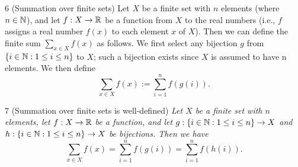 \begin{definition}{6}
    \label{finite-set-sum}
    (Summation over finite sets) Let $X$ be a finite set with $n$ elements (where
    $n \in \mathbb{N}$), and let $f: X \rightarrow \mathbb{R}$ be a function from $X$
    to the real numbers (i.e., $f$ assigns a real number $f(x)$ to each element
    $x$ of $X$). Then we can define the finite sum $\sum_{x \in X} f(x)$ as follows.
    We first select any bijection $g$ from $\{i \in \mathbb{N} : 1 \leq i \leq n\}$
    to $X$; such a bijection exists since $X$ is assumed to have n elements. We
    then define
    \begin{equation*}
        \sum_{x \in X} f(x) := \sum_{i=1}^{n} f(g(i)).
    \end{equation*}
\end{definition}

\begin{proposition}{7}
    \label{finite-set-sum-well-defined}
    (Summation over finite sets is well-defined) \emph{Let $X$ be a finite set
    with $n$ elements, let $f: X \rightarrow \mathbb{R}$ be a function, and let $g: \{i \in \mathbb{N} : 1 \leq i \leq n\} \rightarrow X$
    and $h: \{i \in \mathbb{N} : 1 \leq i \leq n\} \rightarrow X$ be bijections.
    Then we have
    \begin{equation*}
        \sum_{x \in X} f(x) = \sum_{i=1}^{n} f(g(i)) = \sum_{i=1}^{n} f(h(i)).
    \end{equation*}}
\end{proposition}

